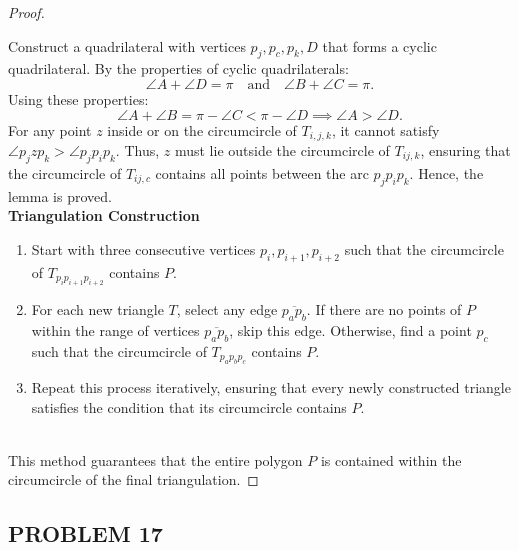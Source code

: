 \documentclass{article}
\begin{document}
\begin{proof}
\begin{figure}[h]
        \label{fig:q2_proof}
    \end{figure}
    Construct a quadrilateral with vertices \( p_j, p_c, p_k, D \) that forms a cyclic quadrilateral. By the properties of cyclic quadrilaterals:
    \[
        \angle A + \angle D = \pi \quad \text{and} \quad \angle B + \angle C = \pi.
    \]
    Using these properties:
    \[
        \angle A + \angle B = \pi - \angle C < \pi - \angle D \implies \angle A > \angle D.
    \]
    For any point \( z \) inside or on the circumcircle of $T_{i,j,k}$, it cannot satisfy \( \angle p_j z p_k > \angle p_j p_i p_k \). Thus, \( z \) must lie outside the circumcircle of \( T_{ij,k} \), ensuring that the circumcircle of \( T_{ij,c} \) contains all points between the arc \( p_j p_i p_k \). Hence, the lemma is proved.
    \\
    \textbf{Triangulation Construction}
    \begin{enumerate}
        \item Start with three consecutive vertices \( p_i, p_{i+1}, p_{i+2} \) such that the circumcircle of \( T_{p_i p_{i+1} p_{i+2}} \) contains \( P \).
        \item For each new triangle \( T \), select any edge \( \overline{p_a p_b} \). If there are no points of \( P \) within the range of vertices \( \overline{p_a p_b} \), skip this edge. Otherwise, find a point \( p_c \) such that the circumcircle of \( T_{p_a p_b p_c} \) contains \( P \).
        \item Repeat this process iteratively, ensuring that every newly constructed triangle satisfies the condition that its circumcircle contains \( P \).
    \end{enumerate}
    \\
    This method guarantees that the entire polygon \( P \) is contained within the circumcircle of the final triangulation.
\end{proof}

\newpage

\subsection*{PROBLEM 17}
\end{document}
